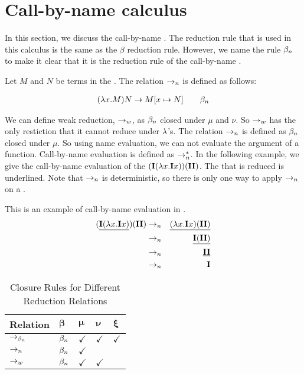 
\section{Call-by-name calculus}
In this section, we discuss the call-by-name \lc. 
The reduction rule that is used in this calculus is the same as the $\beta$ reduction rule.
However, we name the rule $\beta_n$ to make it clear that it is the reduction rule of the call-by-name \lc.

\begin{definition}
	\label{def:call-by-name-reduction}
	Let $M$ and $N$ be terms in the \lc. The relation $\to_n$ is defined as follows:
	
	\begin{align*}
		(\lambda {x}.{M})N \to M [{x}\mapsto{N}] \quad \quad \beta_n
	\end{align*}
\end{definition}


We can define weak reduction, $\to_w$, as $\beta_n$ closed under $\mu$ and $\nu$. So $\to_w$ has the only restiction that it cannot reduce under $\lambda$'s.
The relation $\to_n$ is defined as $\beta_n$ closed under $\mu$. So using name evaluation, we can not evaluate the argument of a function. 
Call-by-name evaluation is defined as $\to_n^*$. In the following example, we give the call-by-name evaluation of the \lterm $(\mathbf{I}(\lambda {x}.{\mathbf{I} x}))(\mathbf{I} \mathbf{I})$.
The \bre that is reduced is underlined.
Note that $\to_n$ is deterministic, so there is only one way to apply $\to_n$ on a \lterm.

\begin{example}
	This is an example of call-by-name evaluation in \lan.
	\label{ex:call-by-name}
	\begin{eqnarray*}
		(\underline{\mathbf{I}(\lambda {x}.{\mathbf{I} x})})(\mathbf{I} \mathbf{I}) &\to_n& \underline{(\lambda {x}.{\mathbf{I} x}) (\mathbf{I} \mathbf{I})} \\
		&\to_n& \underline{\mathbf{I} (\mathbf{I} \mathbf{I})} \\
		&\to_n& \underline{\mathbf{I} \mathbf{I}} \\
		&\to_n& \mathbf{I} 
	\end{eqnarray*}
\end{example}


\begin{table}[htbp]
\centering
\begin{tabularx}{\linewidth}{|X|XXXX|}
  \hline
  \textbf{Relation} & $\boldsymbol{\beta}$ & $\boldsymbol{\mu}$ & $\boldsymbol{\nu}$ & $\boldsymbol{\xi}$ \\
	\hline
	$\to_{\beta_n}$ & $\beta_n$ & $\checkmark$ & $\checkmark$ & $\checkmark$ \\
	\hline
	$\to_n$  & $\beta_n$ & $\checkmark$ & 						 &  \\
	\hline
	$\to_w$  & $\beta_n$ & $\checkmark$ & $\checkmark$ &  \\
	\hline
\end{tabularx}
\caption{Closure Rules for Different Reduction Relations}
\label{tab1:closure-rules}
\end{table}
